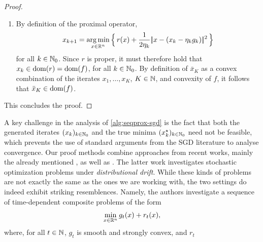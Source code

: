 \begin{proof}
\begin{enumerate}
\[            \]
            Hence,
            \[
                \mathcal{X}_k^\star \subset \{\, x\in\R^n \mid f(x) \leq f(\hat{x}) + c \,\} =: f_{\leq f(\hat{x}) + c}
            \]
            for all $k\in\N_0$. Coupled with the fact that $f$ has bounded lower-level sets,
            it follows that the family $(\mathcal{X}_k^\star)_{k\in\N_0}$ is uniformly bounded.
            In particular, since $f_{\leq f(\hat{x}) + c}$ is also closed,
            by continuity of $f$, and thus compact, it follows that the image of the set
            $f_{\leq f(\hat{x}) + c}$ under the continuous map $\Pi_{\mathcal{X}}$ (\cref{prop:projection-is-lipschitz})
            is compact. Therefore, we obtain
            \[
                \sup_{k\in\N} \sup_{x_k^\star \in \mathcal{X}_k^\star} 
                \norm{\Pi_{\mathcal{X}}(x_k^\star)}
                \leq
                \sup_{x\in f_{\leq f(\hat{x}) + c}} 
                \norm{\Pi_{\mathcal{X}}(x)}
                < \infty,
            \]
            as desired.
        \item By definition of the proximal operator,
            \[
                x_{k + 1} = \operatorname*{arg\,min}_{x\in\mathbb{R}^n} \Big\{\, r(x) + \frac{1}{2\eta_k} |\!|x - (x_k - \eta_k g_k)|\!|^2 \,\Big\}
            \]
            for all $k\in\N_0$.
            Since $r$ is proper, it must therefore hold that $x_{k} \in \operatorname{dom}(r) = \operatorname{dom}(f)$, for all $k\in\N_0$.
            By definition of $\bar{x}_K$ as a convex combination of the iterates $x_1,\dots,x_K$, $K\in\mathbb{N}$,
            and convexity of $f$, it follows that $\bar{x}_K \in \operatorname{dom}(f)$.
    \end{enumerate}
    This concludes the proof.
\end{proof}
A key challenge in the analysis of \cref{alg:seqprox-sgd} is the fact that both
the generated iterates $(x_k)_{k\in\mathbb{N}_0}$ and the true minima $(x_k^\star)_{k\in\mathbb{N}_0}$
need not be feasible, which prevents the use of
standard arguments from the SGD literature to analyse convergence. Our proof
methods combine approaches from recent works, mainly
the already mentioned \cite{nedich2023huber}, as well as
\cite{cutler2023stochastic}. The latter work
investigates stochastic optimization problems under \textit{distributional drift}.
While these kinds of problems are not exactly the same as the ones we are
working with, the two settings do indeed exhibit striking resemblences.
Namely, the authors investigate a sequence of
time-dependent composite problems of the form
\[
    \min_{x\in\mathbb{R}^n} g_t(x) + r_t(x),
\]
where, for all $t\in\mathbb{N}$, $g_t$ is smooth and strongly convex, and $r_t$
